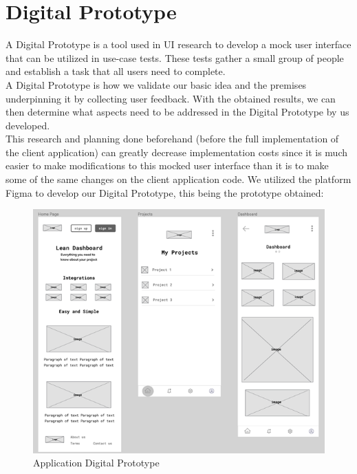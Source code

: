 \documentclass[a4paper,twoside,10pt]{report}
\begin{document}
\section{Digital Prototype}
A Digital Prototype is a tool used in UI research to develop a mock user interface that can be utilized in use-case tests. These tests gather a small group of people and establish a task that all users need to complete. 
\\ \newline
A Digital Prototype is how we validate our basic idea and the premises underpinning it by collecting user feedback.
With the obtained results, we can then determine what aspects need to be addressed in the Digital Prototype by us developed.
\\ \newline
This research and planning done beforehand (before the full implementation of the client application) can greatly decrease implementation costs since it is much easier to make modifications to this mocked user interface than it is to make some of the same changes on the client application code.
We utilized the platform Figma\cite{FIGMA} to develop our Digital Prototype, this being the prototype obtained:
\\ \newline
\begin{figure}[h!]
\center
    \includegraphics[width=\textwidth]{digital-prototype.png}
\caption{Application Digital Prototype}
\end{figure}
\end{document}
